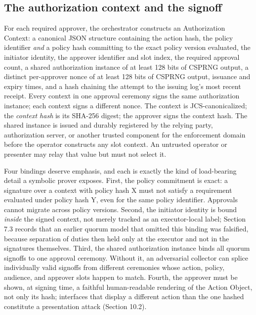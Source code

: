 \documentclass[11pt]{article}
\begin{document}
\subsection{The authorization context and the signoff}

For each required approver, the orchestrator constructs an Authorization Context: a
canonical JSON structure containing the action hash, the policy identifier
\emph{and} a policy hash committing to the exact policy version evaluated, the
initiator identity, the approver identifier and slot index, the required approval
count, a shared authorization instance of at least 128 bits of CSPRNG output, a
distinct per-approver nonce of at least 128 bits of CSPRNG output, issuance and
expiry times, and a hash chaining the attempt to the issuing log's most recent
receipt. Every context in one approval ceremony signs the same authorization
instance; each context signs a different nonce. The context is JCS-canonicalized;
the \emph{context hash} is its SHA-256 digest; the approver signs the context hash.
The shared instance is issued and durably registered by the relying party,
authorization server, or another trusted component for the enforcement domain
before the operator constructs any slot context. An untrusted operator or
presenter may relay that value but must not select it.

Four bindings deserve emphasis, and each is exactly the kind of load-bearing
detail a symbolic prover exposes. First, the policy commitment is exact: a
signature over a context with policy hash X must not satisfy a requirement
evaluated under policy hash Y, even for the same policy identifier. Approvals
cannot migrate across policy versions. Second, the initiator identity is bound
\emph{inside} the signed context, not merely tracked as an executor-local label;
Section 7.3 records that an earlier quorum model that omitted this binding was
falsified, because separation of duties then held only at the executor and not in
the signatures themselves. Third, the shared authorization instance binds all
quorum signoffs to one approval ceremony. Without it, an adversarial collector
can splice individually valid signoffs from different ceremonies whose action,
policy, audience, and approver slots happen to match. Fourth, the approver must be shown, at signing time, a
faithful human-readable rendering of the Action Object, not only its hash;
interfaces that display a different action than the one hashed constitute a
presentation attack (Section 10.2).
\end{document}
